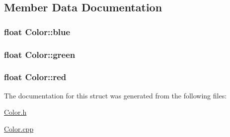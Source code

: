\subsection{Member Data Documentation}
\hypertarget{structColor_a175386a89265cede8f6ae694c32677c3}{
\subsubsection[{blue}]{\setlength{\rightskip}{0pt plus 5cm}float Color\-::blue}}\label{structColor_a175386a89265cede8f6ae694c32677c3}
\hypertarget{structColor_a7644dc2e2c23e40894929ce5127452a1}{
\subsubsection[{green}]{\setlength{\rightskip}{0pt plus 5cm}float Color\-::green}}\label{structColor_a7644dc2e2c23e40894929ce5127452a1}
\hypertarget{structColor_aa897fe858468c4bff0f286d0dfd43178}{
\subsubsection[{red}]{\setlength{\rightskip}{0pt plus 5cm}float Color\-::red}}\label{structColor_aa897fe858468c4bff0f286d0dfd43178}


The documentation for this struct was generated from the following files\-:\begin{DoxyCompactItemize}
\item 
\hyperlink{Color_8h}{Color.\-h}\item 
\hyperlink{Color_8cpp}{Color.\-cpp}\end{DoxyCompactItemize}
